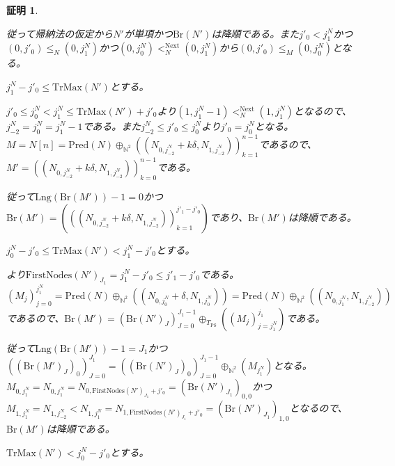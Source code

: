 \documentclass[dvipdfmx,uplatex]{jsarticle}
\theoremstyle{customnonumberbreakfortheorem}
\theoremstyle{customnonumberbreakforproof}
\newtheorem{hideableproof}{証明}
\begin{document}
\begin{hideableproof}
\begin{indented}
\begin{indented}
\begin{indented}
\begin{indented}
\begin{indented}
\begin{indented}
							\item 従って帰納法の仮定から\(N'\)が単項かつ\(\textrm{Br}(N')\)は降順である。また\(j'_0 < j_1^N\)かつ\((0,j'_0) \leq_N (0,j_1^N)\)かつ\((0,j_0^N) <_N^{\textrm{Next}} (0,j_1^N)\)から\((0,j'_0) \leq_M (0,j_0^N)\)となる。
							\item
							\item \(j_1^N-j'_0 \leq \textrm{TrMax}(N')\)とする。
							\begin{indented}
								\item \(j'_0 \leq j_0^N < j_1^N \leq \textrm{TrMax}(N')+j'_0\)より\((1,j_1^N-1) <_N^{\textrm{Next}} (1,j_1^N)\)となるので、\(j_{-2}^N = j_0^N = j_1^N-1\)である。また\(j_{-2}^N \leq j'_0 \leq j_0^N\)より\(j'_0 = j_0^N\)となる。\(M = N[n] = \textrm{Pred}(N) \oplus_{\mathbb{N}^2} ((N_{0,j_{-2}^N}+k \delta,N_{1,j_{-2}^N}))_{k=1}^{n-1}\)であるので、\(M' = ((N_{0,j_{-2}^N}+k \delta,N_{1,j_{-2}^N}))_{k=0}^{n-1}\)である。
								\item 従って\(\textrm{Lng}(\textrm{Br}(M'))-1 = 0\)かつ\(\textrm{Br}(M') = (((N_{0,j_{-2}^N}+k \delta,N_{1,j_{-2}^N}))_{k=1}^{j'_1-j'_0})\)であり、\(\textrm{Br}(M')\)は降順である。
							\end{indented}
							\item
							\item \(j_0^N-j'_0 \leq \textrm{TrMax}(N') < j_1^N-j'_0\)とする。
							\begin{indented}
								\item {}より\(\textrm{FirstNodes}(N')_{J_1} = j_1^N-j'_0 \leq j'_1-j'_0\)である。\((M_j)_{j=0}^{j_1^N} = \textrm{Pred}(N) \oplus_{\mathbb{N}^2} ((N_{0,j_0^N}+\delta,N_{1,j_0^N})) = \textrm{Pred}(N) \oplus_{\mathbb{N}^2} ((N_{0,j_1^N},N_{1,j_{-2}^N}))\)であるので、\(\textrm{Br}(M') = (\textrm{Br}(N')_J)_{J=0}^{J_1-1} \oplus_{T_{\textrm{PS}}} ((M_j)_{j=j_1^N}^{j_1})\)である。
								\item 従って\(\textrm{Lng}(\textrm{Br}(M'))-1 = J_1\)かつ\(((\textrm{Br}(M')_J)_0)_{J=0}^{J_1} = ((\textrm{Br}(N')_J)_0)_{J=0}^{J_1-1} \oplus_{\mathbb{N}^2} (M_{j_1^N})\)となる。\(M_{0,j_1^N} = N_{0,j_1^N} = N_{0,\textrm{FirstNodes}(N')_{J_1}+j'_0} = (\textrm{Br}(N')_{J_1})_{0,0}\)かつ\(M_{1,j_1^N} = N_{1,j_{-2}^N} < N_{1,j_1^N} = N_{1,\textrm{FirstNodes}(N')_{J_1}+j'_0} = (\textrm{Br}(N')_{J_1})_{1,0}\)となるので、\(\textrm{Br}(M')\)は降順である。
							\end{indented}
							\item
							\item \(\textrm{TrMax}(N') < j_0^N-j'_0\)とする。

\end{indented}
\end{indented}
\end{indented}
\end{indented}
\end{indented}
\end{indented}
\end{hideableproof}
\end{document}
